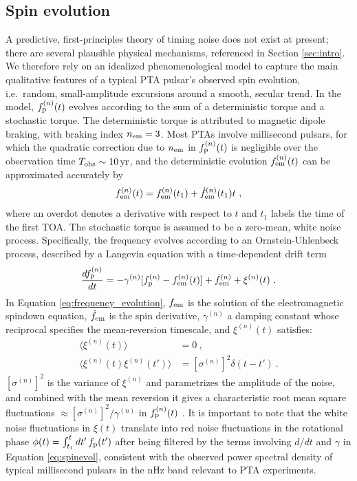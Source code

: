 \documentclass[fleqn,usenatbib,useAMS]{mnras}
\begin{document}
\subsection{Spin evolution} \label{sec:psr_frequency}
A predictive, first-principles theory of timing noise does not exist at present; there are several plausible physical mechanisms, referenced in Section \ref{sec:intro}. We therefore rely on an idealized phenomenological model to capture the main qualitative features of a typical PTA pulsar's observed spin evolution, i.e.\ random, small-amplitude excursions around a smooth, secular trend. In the model, $f_{\rm p}^{(n)}(t)$ evolves according to the sum of a deterministic torque and a stochastic torque. The deterministic torque is attributed to magnetic dipole braking, with braking index $n_{\rm em}=3$. Most PTAs involve millisecond pulsars, for which the quadratic correction due to $n_{\rm em}$ in $f_{\rm p}^{(n)}(t)$ is negligible over the observation time $T_{\rm obs} \sim 10 \, {\rm yr}$, and the deterministic evolution $f_{\rm em}^{(n)}(t)$ can be approximated accurately by 
\begin{equation}
 f_{\rm em}^{(n)}(t) = f_{\rm em}^{(n)}(t_1) + \dot{f}_{\rm em}^{(n)}(t_1)t \ , \label{eq:spinevol}
\end{equation} where an overdot denotes a derivative with respect to $t$ and $t_1$ labels the time of the first TOA. The stochastic torque is assumed to be a zero-mean, white noise process. Specifically, the frequency evolves according to an Ornstein-Uhlenbeck process, described by a Langevin equation with a time-dependent drift term \citep{Vargas}
\begin{equation}
	\frac{df_{\rm p}^{(n)}}{dt} = -\gamma^{(n)}	 [f_{\rm p}^{(n)} - f_{\rm em}^{(n)} (t)] + \dot{f}_{\rm em}^{(n)} +\xi^{(n)}(t) \ . 
	\label{eq:frequency_evolution}
\end{equation}
In Equation \eqref{eq:frequency_evolution}, $f_{\rm em}$ is the solution of the electromagnetic spindown equation, $\dot{f}_{\rm em}$ is the spin derivative, $\gamma^{(n)}$ a damping constant whose reciprocal specifies the mean-reversion timescale, and $\xi^{(n)}(t)$ satisfies:
\begin{align}
	\langle \xi^{(n)}(t) \rangle &= 0 \ , \\
	\langle \xi^{(n)}(t) \xi^{(n)}(t') \rangle &= [\sigma^{(n)}]^2 \delta(t - t') \ .	\label{eq:xieqn}
\end{align}
$[\sigma^{(n)}]^2$ is the variance of $\xi^{(n)}$ and parametrizes the amplitude of the noise, and combined with the mean reversion it gives a characteristic root mean square fluctuations $\approx [\sigma^{(n)}]^2 / \gamma^{(n)}$ in $f_{\rm p}^{(n)}(t)$ \citep{gardiner2009stochastic}. It is important to note that the white noise fluctuations in $\xi(t)$ translate into red noise fluctuations in the rotational phase $\phi(t) = \int_{t_1}^t dt' \, f_{\rm p}(t')$ after being filtered by the terms involving $d/dt$ and $\gamma$ in Equation \eqref{eq:spinevol}, consistent with the observed power spectral density of typical millisecond pulsars in the nHz band relevant to PTA experiments. \newline 
\end{document}

